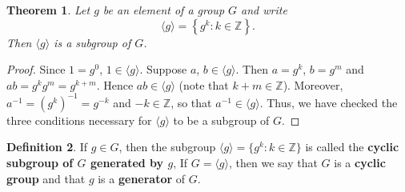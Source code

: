 \documentclass[11pt]{article}
\newcommand{\Z} {{\mathbb Z}}
\newcommand{\set}[1]{\left\{#1\right\}}
\newcommand{\<}{\ensuremath{\langle}}
\renewcommand{\>}{\ensuremath{\rangle}}
\theoremstyle{plain}
\newtheorem{thm}{Theorem}%
\theoremstyle{definition}
\newtheorem{defn}[thm]{Definition}
\begin{document}
\begin{thm}
  Let $g$ be an element of a group $G$ and write
$$\langle g\rangle = \set{g^k: k\in \Z}.$$
Then $\langle g\rangle$ is a subgroup of $G$.
\end{thm}
\begin{proof}  Since $1=g^0$, $1\in \langle g\rangle$.  Suppose $a$,
$b\in \langle g\rangle$.  Then $a=g^k$, $b=g^m$ and
$ab=g^kg^m=g^{k+m}$. Hence $ab\in \langle g\rangle$ (note that
$k+m\in \Z$).  Moreover, $a^{-1} = (g^k)^{-1} = g^{-k}$ and $-k\in
\Z$, so that $a^{-1}\in \langle g\rangle$.  Thus, we have checked
the three conditions necessary for $\langle g\rangle$ to be a
subgroup of $G$.
\end{proof}
\begin{defn}  If $g\in G$, then the subgroup $\langle g\rangle = \{g^k:
k\in \Z\}$ is called the {\bf cyclic subgroup of $G$ generated by
$g$}, If $G=\langle g\rangle$, then we say that $G$ is a {\bf
cyclic group} and that $g$ is a {\bf generator} of $G$.
\end{defn}
\end{document}
